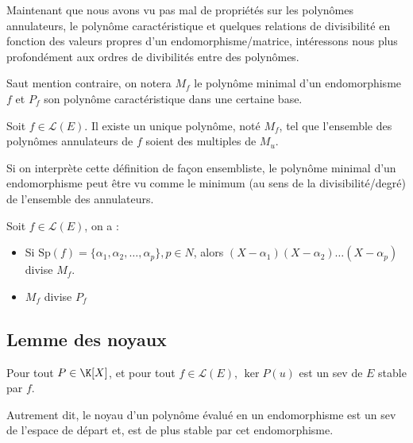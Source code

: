 Maintenant que nous avons vu pas mal de propriétés sur les polynômes annulateurs, le polynôme caractéristique et quelques
relations de divisibilité en fonction des valeurs propres d'un endomorphisme/matrice, intéressons nous plus profondément 
aux ordres de divibilités entre des polynômes. 

\vspace{0.3cm}

Saut mention contraire, on notera $M_f$ le polynôme minimal d'un endomorphisme $f$ et $P_f$ son polynôme caractéristique 
dans une certaine base. 

\begin{definition}
    Soit $f \in \mathcal{L}(E)$. Il existe un unique polynôme, noté $M_f$, tel que l'ensemble des polynômes annulateurs 
    de $f$ soient des multiples de $M_u$. 

    \vspace{0.3cm}

    Si on interprète cette définition de façon ensembliste, le polynôme minimal d'un endomorphisme peut être vu 
    comme le minimum (au sens de la divisibilité/degré) de l'ensemble des annulateurs. 
\end{definition}

\begin{proposition}
    Soit $f \in \mathcal{L}(E)$, on a :
    \begin{itemize}
        \item Si $\text{Sp}(f) = \{\alpha_1, \alpha_2, \dots, \alpha_p\}, p \in N$, alors $(X - \alpha_1)(X - \alpha_2) \dots (X - \alpha_p)$ divise $M_f$.
        \item $M_f$ divise $P_f$
    \end{itemize}
\end{proposition}

\newpage 

\subsection{Lemme des noyaux}

\begin{prop}
    Pour tout $P \in \K[X]$, et pour tout $f \in \mathcal{L}(E)$, $\ker P(u)$ est un sev de $E$ stable par $f$. 

    \vspace{0.3cm}

    Autrement dit, le noyau d'un polynôme évalué en un endomorphisme est un sev de l'espace de départ et, est de plus stable par cet endomorphisme. 
\end{prop}

